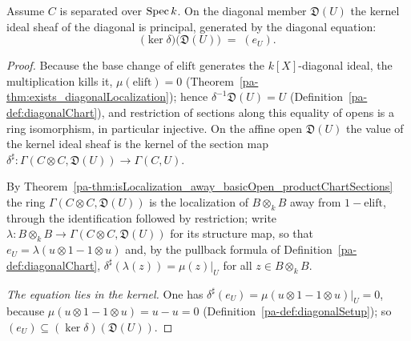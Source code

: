 \begin{theorem}
  \label{pa-thm:diagonal_ker_ideal_diagonalChart}
  \leanok

  Assume \(C\) is separated over \(\operatorname{Spec} k\). On the diagonal member \(\mathfrak D(U)\) the kernel
  ideal sheaf of the diagonal is principal, generated by the diagonal equation:
  \[
    \bigl(\ker \delta\bigr)\bigl(\mathfrak D(U)\bigr) \;=\; (e_U).
  \]
\end{theorem}
\begin{proof}
  \leanok
  Because the base change of \(\mathrm{elift}\) generates the \(k[X]\)-diagonal ideal, the
  multiplication kills it, \(\mu(\mathrm{elift}) = 0\)
  (Theorem~\ref{pa-thm:exists_diagonalLocalization}); hence \(\delta^{-1}\mathfrak D(U) = U\)
  (Definition~\ref{pa-def:diagonalChart}), and restriction of sections along this equality of opens
  is a ring isomorphism, in particular injective. On the affine open \(\mathfrak D(U)\) the value
  of the kernel ideal sheaf is the kernel of the section map
  \(\delta^\sharp \colon \Gamma(C \otimes C, \mathfrak D(U)) \to \Gamma(C, U)\).

  By Theorem~\ref{pa-thm:isLocalization_away_basicOpen_productChartSections} the ring
  \(\Gamma(C \otimes C, \mathfrak D(U))\) is the localization of \(B \otimes_k B\) away from
  \(1 - \mathrm{elift}\), through the identification followed by restriction; write
  \(\lambda \colon B \otimes_k B \to \Gamma(C \otimes C, \mathfrak D(U))\) for its structure map,
  so that \(e_U = \lambda(u \otimes 1 - 1 \otimes u)\) and, by the pullback formula of
  Definition~\ref{pa-def:diagonalChart}, \(\delta^\sharp(\lambda(z)) = \mu(z)\big|_{U}\) for all
  \(z \in B \otimes_k B\).

  \emph{The equation lies in the kernel.} One has
  \(\delta^\sharp(e_U) = \mu(u \otimes 1 - 1 \otimes u)\big|_{U} = 0\), because
  \(\mu(u \otimes 1 - 1 \otimes u) = u - u = 0\) (Definition~\ref{pa-def:diagonalSetup}); so
  \((e_U) \subseteq (\ker \delta)(\mathfrak D(U))\).


\end{proof}
